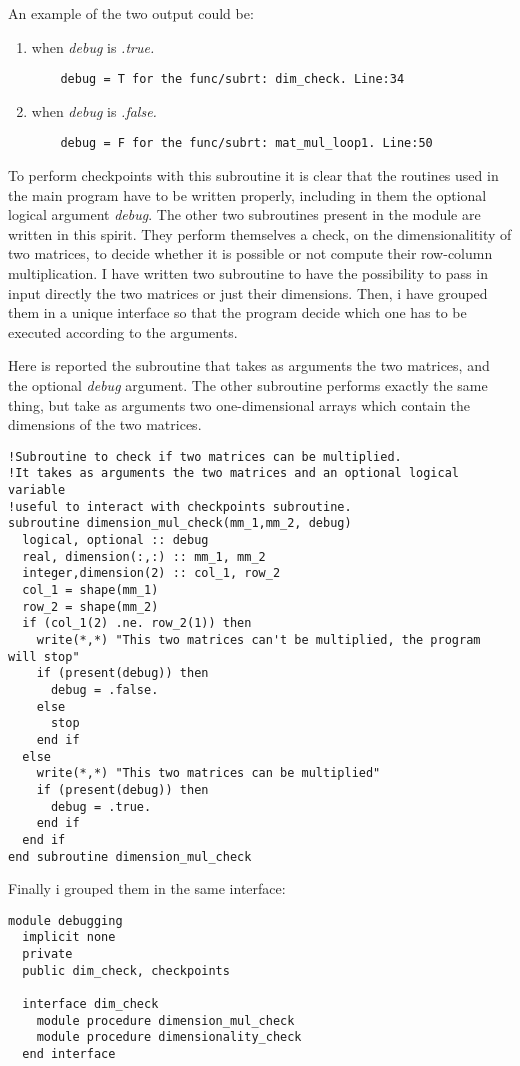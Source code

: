 \documentclass[prb,9pt,notitlepage]{revtex4-1}
\begin{document}
An example of the two output could be:
\begin{enumerate}
  \item when \textit{debug} is \textit{.true.}
  \begin{lstlisting}
    debug = T for the func/subrt: dim_check. Line:34
  \end{lstlisting}
  \item when \textit{debug} is \textit{.false.}
  \begin{lstlisting}
    debug = F for the func/subrt: mat_mul_loop1. Line:50
  \end{lstlisting}
\end{enumerate}
To perform checkpoints with this subroutine it is clear that the routines used in the main program have to be written properly, including in them the optional logical argument \textit{debug}.
The other two subroutines present in the module are written in this spirit. They perform themselves a check, on the dimensionalitity of two matrices, to decide whether it is possible or not compute their row-column multiplication.
I have written two subroutine to have the possibility to pass in input directly the two matrices or just their dimensions. Then, i have grouped them in a unique interface so that the program decide which one has to be executed according to the arguments.

Here is reported the subroutine that takes as arguments the two matrices, and the optional \textit{debug} argument. The other subroutine performs exactly the same thing, but take as arguments two one-dimensional arrays which contain the dimensions of the two matrices.
\begin{lstlisting}
!Subroutine to check if two matrices can be multiplied.
!It takes as arguments the two matrices and an optional logical variable
!useful to interact with checkpoints subroutine.
subroutine dimension_mul_check(mm_1,mm_2, debug)
  logical, optional :: debug
  real, dimension(:,:) :: mm_1, mm_2
  integer,dimension(2) :: col_1, row_2
  col_1 = shape(mm_1)
  row_2 = shape(mm_2)
  if (col_1(2) .ne. row_2(1)) then
    write(*,*) "This two matrices can't be multiplied, the program will stop"
    if (present(debug)) then
      debug = .false.
    else
      stop
    end if
  else
    write(*,*) "This two matrices can be multiplied"
    if (present(debug)) then
      debug = .true.
    end if
  end if
end subroutine dimension_mul_check
\end{lstlisting}
Finally i grouped them in the same interface:
\begin{lstlisting}
module debugging
  implicit none
  private
  public dim_check, checkpoints

  interface dim_check
    module procedure dimension_mul_check
    module procedure dimensionality_check
  end interface

\end{lstlisting}
\end{document}
